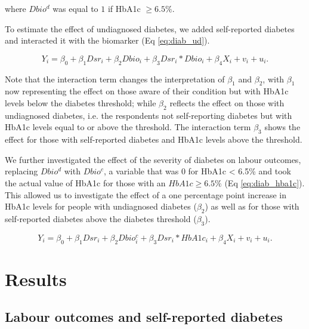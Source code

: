\documentclass[10pt,letterpaper]{article}
\begin{document}
where $Dbio^{d}$ was equal to $1$ if \ac{HbA1c} $\geq6.5\%$. 

To estimate the effect of undiagnosed diabetes, we added self-reported diabetes and interacted it with the biomarker (Eq \ref{eq:diab_ud}).

\begin{equation}
Y_{i}=\beta_{0}+\beta_{1}Dsr_{i}+\beta_{2}Dbio_{i}+\beta_{3}Dsr_{i}*Dbio_{i}+\beta_{4}X_{i}+v_{i}+u_{i}.\label{eq:diab_ud}
\end{equation}

Note that the interaction term changes the interpretation of $\beta_{1}$ and $\beta_{2}$, with $\beta_{1}$ now representing the effect on those aware of their condition but with \ac{HbA1c} levels below the diabetes threshold; while $\beta_{2}$ reflects the effect on those with undiagnosed diabetes, i.e. the respondents not self-reporting diabetes but with \ac{HbA1c} levels equal to or above the threshold. The interaction term $\beta_{3}$ shows the effect for those with self-reported diabetes and \ac{HbA1c} levels above the threshold.

We further investigated the effect of the severity of diabetes on labour outcomes, replacing $Dbio^{d}$ with $Dbio^{c}$, a variable that was $0$ for \ac{HbA1c} < 6.5\% and took the actual value of \ac{HbA1c} for those with an $HbA1c \geq 6.5\%$ (Eq \ref{eq:diab_hba1c}). This allowed us to investigate the effect of a one percentage point increase in \ac{HbA1c} levels for people with undiagnosed diabetes ($\beta_{2}$) as well as for those with self-reported diabetes above the diabetes threshold ($\beta_{3}$).

\begin{equation}
Y_{i}=\beta_{0}+\beta_{1}Dsr_{i}+\beta_{2}Dbio^{c}_{i}+\beta_{3}Dsr_{i}*HbA1c_{i}+\beta_{4}X_{i}+v_{i}+u_{i}.\label{eq:diab_hba1c}
\end{equation}




\section*{\label{sec:cha_4_results}Results}


\subsection*{Labour outcomes and self-reported diabetes}
\end{document}

